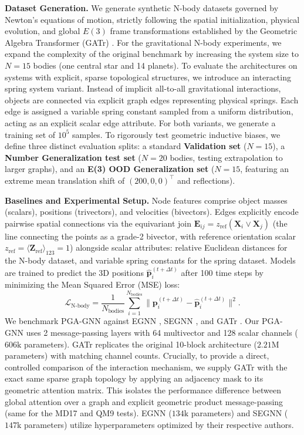 \documentclass[10pt]{article}
\begin{document}
\noindent\textbf{Dataset Generation.}
We generate synthetic N-body datasets governed by Newton's equations of motion, strictly following the spatial initialization, physical evolution, and global $E(3)$ frame transformations established by the Geometric Algebra Transformer (GATr) \citep{gatr}.
For the gravitational N-body experiments, we expand the complexity of the original benchmark by increasing the system size to $N=15$ bodies (one central star and 14 planets). To evaluate the architectures on systems with explicit, sparse topological structures, we introduce an interacting spring system variant. Instead of implicit all-to-all gravitational interactions, objects are connected via explicit graph edges representing physical springs. Each edge is assigned a variable spring constant sampled from a uniform distribution, acting as an explicit scalar edge attribute.
For both variants, we generate a training set of $10^5$ samples. To rigorously test geometric inductive biases, we define three distinct evaluation splits: a standard \textbf{Validation set} ($N=15$), a \textbf{Number Generalization test set} ($N=20$ bodies, testing extrapolation to larger graphs), and an \textbf{E(3) OOD Generalization set} ($N=15$, featuring an extreme mean translation shift of $(200, 0, 0)^\top$ and reflections).

\noindent\textbf{Baselines and Experimental Setup.}
Node features comprise object masses (scalars), positions (trivectors), and velocities (bivectors). Edges explicitly encode pairwise spatial connections via the equivariant join $\mathbf{E}_{ij} = z_{\text{ref}} (\mathbf{X}_i \vee \mathbf{X}_j)$ (the line connecting the points as a grade-2 bivector, with reference orientation scalar $z_{\text{ref}} = \langle \mathbf{Z}_{\text{ref}} \rangle_{123} = 1$) alongside scalar attributes: relative Euclidean distances for the N-body dataset, and variable spring constants for the spring dataset. Models are trained to predict the 3D positions $\hat{\mathbf{p}}_i^{(t+\Delta t)}$ after 100 time steps by minimizing the Mean Squared Error (MSE) loss:
\begin{equation}
    \mathcal{L}_{\text{N-body}} = \frac{1}{N_{\text{bodies}}} \sum_{i=1}^{N_{\text{bodies}}} \|\mathbf{p}_i^{(t+\Delta t)} - \hat{\mathbf{p}}_i^{(t+\Delta t)}\|^2.
    \label{eq:loss_nbody}
\end{equation}
We benchmark PGA-GNN against EGNN \citep{egnn}, SEGNN \citep{segnn}, and GATr \citep{gatr}. Our PGA-GNN uses 2 message-passing layers with 64 multivector and 128 scalar channels ($606\text{k}$ parameters). GATr replicates the original 10-block architecture ($2.21\text{M}$ parameters) with matching channel counts. Crucially, to provide a direct, controlled comparison of the interaction mechanism, we supply GATr with the exact same sparse graph topology by applying an adjacency mask to its geometric attention matrix. This isolates the performance difference between global attention over a graph and explicit geometric product message-passing (same for the MD17 and QM9 tests). EGNN ($134\text{k}$ parameters) and SEGNN ($147\text{k}$ parameters) utilize hyperparameters optimized by their respective authors.
\end{document}
